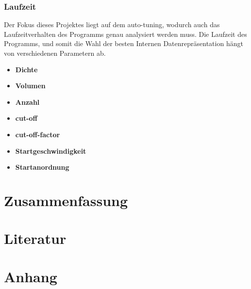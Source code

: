 \documentclass[
	12pt,
	a4paper,
	BCOR10mm,
	DIV14,
	headsepline,
]{scrreprt}
\begin{document}
\subsection{Laufzeit}
Der Fokus dieses Projektes liegt auf dem auto-tuning, wodurch auch das Laufzeitverhalten des Programms genau analysiert werden muss. Die Laufzeit des Programms, und somit die Wahl der besten Internen Datenrepräsentation hängt von verschiedenen Parametern ab.
\begin{itemize}
	\item \textbf{Dichte}
	\item \textbf{Volumen}
	\item \textbf{Anzahl}
	\item \textbf{cut-off}
	\item \textbf{cut-off-factor}
	\item \textbf{Startgeschwindigkeit}
	\item \textbf{Startanordnung}
\end{itemize}

\chapter{Zusammenfassung}
\label{Zusammenfassung}


\chapter{Literatur}
\label{Literatur}


\chapter{Anhang}
\label{Anhang}
\end{document}
